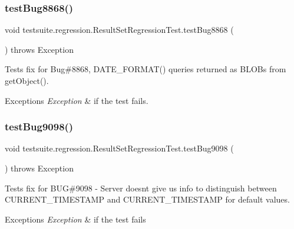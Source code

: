 \subsubsection{\texorpdfstring{test\+Bug8868()}{testBug8868()}}
{\footnotesize\ttfamily void testsuite.\+regression.\+Result\+Set\+Regression\+Test.\+test\+Bug8868 (\begin{DoxyParamCaption}{ }\end{DoxyParamCaption}) throws Exception}

Tests fix for Bug\#8868, D\+A\+T\+E\+\_\+\+F\+O\+R\+M\+A\+T() queries returned as B\+L\+O\+Bs from get\+Object().


\begin{DoxyExceptions}{Exceptions}
{\em Exception} & if the test fails. \\
\hline
\end{DoxyExceptions}
\mbox{\label{classtestsuite_1_1regression_1_1_result_set_regression_test_a73f559230b24a5776a1ce47569f3f82a}} 
\subsubsection{\texorpdfstring{test\+Bug9098()}{testBug9098()}}
{\footnotesize\ttfamily void testsuite.\+regression.\+Result\+Set\+Regression\+Test.\+test\+Bug9098 (\begin{DoxyParamCaption}{ }\end{DoxyParamCaption}) throws Exception}

Tests fix for B\+UG\#9098 -\/ Server doesn\textquotesingle{}t give us info to distinguish between C\+U\+R\+R\+E\+N\+T\+\_\+\+T\+I\+M\+E\+S\+T\+A\+MP and \textquotesingle{}C\+U\+R\+R\+E\+N\+T\+\_\+\+T\+I\+M\+E\+S\+T\+A\+MP\textquotesingle{} for default values.


\begin{DoxyExceptions}{Exceptions}
{\em Exception} & if the test fails \\
\hline
\end{DoxyExceptions}
\mbox{\label{classtestsuite_1_1regression_1_1_result_set_regression_test_ad29ed5c9d0749bc7bbdcbbacd1b45910}} 
